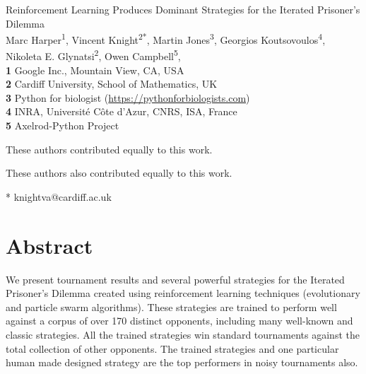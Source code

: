 \documentclass[10pt,letterpaper]{article}
\date{}
\begin{document}
\vspace*{0.2in}

\begin{flushleft}
{\Large
\textbf\newline
{ Reinforcement Learning Produces Dominant Strategies for the Iterated Prisoner's Dilemma }
}
\newline
\\
Marc Harper\textsuperscript{1\Yinyang},
Vincent Knight\textsuperscript{2*\Yinyang},
Martin Jones\textsuperscript{3\ddag},
Georgios Koutsovoulos\textsuperscript{4\ddag},
Nikoleta E. Glynatsi\textsuperscript{2\ddag},
Owen Campbell\textsuperscript{5\ddag},
\\
\bigskip
\textbf{1} Google Inc., Mountain View, CA, USA
\\
\textbf{2} Cardiff University, School of Mathematics, UK
\\
\textbf{3} Python for biologist (\url{https://pythonforbiologists.com})
\\
\textbf{4} INRA, Universit\'{e} C\^{o}te d'Azur, CNRS, ISA, France
\\
\textbf{5} Axelrod-Python Project
\\
\bigskip

%
%
\Yinyang These authors contributed equally to this work.

\ddag These authors also contributed equally to this work.


* knightva@cardiff.ac.uk

\end{flushleft}
\section*{Abstract}
    We present tournament results and several powerful strategies for the Iterated
    Prisoner's Dilemma created using reinforcement learning techniques
    (evolutionary and particle swarm algorithms). These strategies are
    trained to perform well against a corpus of over 170 distinct
    opponents, including many well-known and classic strategies. All
    the trained strategies win standard tournaments against the total collection
    of other opponents. The trained strategies and one particular human made
    designed strategy are the top performers in noisy tournaments also.
\linenumbers
\end{document}
